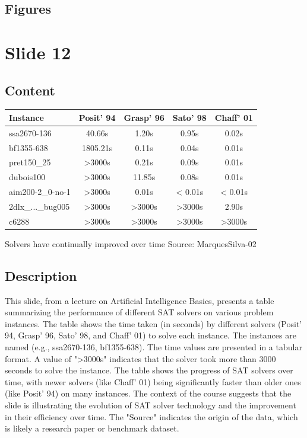 \documentclass{article}%
\begin{document}
\subsection{Figures}%
\begin{figure}[H]%
\centering%
\end{figure}

%
\newpage%
\section{Slide 12}%
\label{sec:Slide12}%
\subsection{Content}%

\begin{tabular}{ |l|c|c|c|c| } 
 \hline
 Instance & Posit' 94 & Grasp' 96 & Sato' 98 & Chaff' 01 \\ 
 \hline
 ssa2670-136 & 40.66s & 1.20s & 0.95s & 0.02s \\ 
 bf1355-638 & 1805.21s & 0.11s & 0.04s & 0.01s \\ 
 pret150\_25 & >3000s & 0.21s & 0.09s & 0.01s \\ 
 dubois100 & >3000s & 11.85s & 0.08s & 0.01s \\ 
 aim200-2\_0-no-1 & >3000s & 0.01s & < 0.01s & < 0.01s \\ 
 2dlx\_...\_bug005 & >3000s & >3000s & >3000s & 2.90s \\ 
 c6288 & >3000s & >3000s & >3000s & >3000s \\ 
 \hline
\end{tabular}
Solvers have continually improved over time
\newline
Source: MarquesSilva-02
%
\subsection{Description}%
This slide, from a lecture on Artificial Intelligence Basics, presents a table summarizing the performance of different SAT solvers on various problem instances.  The table shows the time taken (in seconds) by different solvers (Posit' 94, Grasp' 96, Sato' 98, and Chaff' 01) to solve each instance.  The instances are named (e.g., ssa2670-136, bf1355-638).  The time values are presented in a tabular format.  A value of ">3000s" indicates that the solver took more than 3000 seconds to solve the instance.  The table shows the progress of SAT solvers over time, with newer solvers (like Chaff' 01) being significantly faster than older ones (like Posit' 94) on many instances.  The context of the course suggests that the slide is illustrating the evolution of SAT solver technology and the improvement in their efficiency over time. The "Source" indicates the origin of the data, which is likely a research paper or benchmark dataset.%
\end{document}

